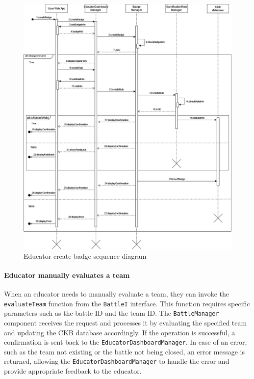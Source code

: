 \begin{figure}[H]
    \begin{center}
        \includegraphics[width=\linewidth]{Images/sequence/Sd_badgeCreation.drawio.png}
        \caption{Educator create badge sequence diagram}
        \label{fig:Educator_create_badge}
    \end{center}
\end{figure}


\paragraph{Educator manually evaluates a team}
When an educator needs to manually evaluate a team, they can invoke the \verb|evaluateTeam| function from the \verb|BattleI| interface. This function requires specific parameters such as the battle ID and the team ID.
The \verb|BattleManager| component receives the request and processes it by evaluating the specified team and updating the CKB database accordingly. If the operation is successful, a confirmation is sent back to the \verb|EducatorDashboardManager|.
In case of an error, such as the team not existing or the battle not being closed, an error message is returned, allowing the \verb|EducatorDashboardManager| to handle the error and provide appropriate feedback to the educator.

